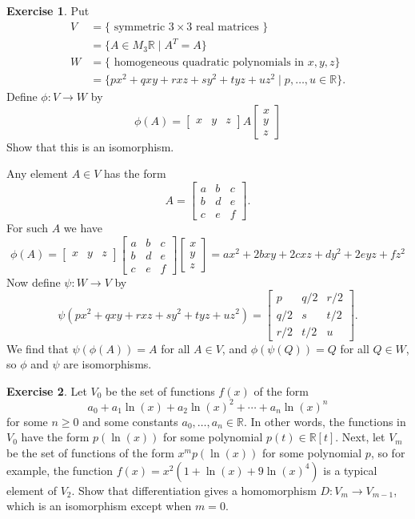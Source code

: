 \documentclass{amsart}
\newcommand{\R}         {{\mathbb{R}}}
\newcommand{\bpm}       {\left[\begin{matrix}}
\newcommand{\epm}       {\end{matrix}\right]}
\newcommand{\tm}        {\times}
\newcommand{\st}        {\;|\;}
\renewcommand{\:}{\colon}
\theoremstyle{definition}
\newtheorem{exercise}{Exercise}
\newenvironment{solution}{{\noindent \bf Solution:}}{}
\begin{document}
\begin{exercise}
 Put 
 \begin{align*}
  V &= \{\text{ symmetric $3\tm 3$ real matrices }\}  \\
    &= \{A\in M_3\R\st A^T=A\} \\
  W &= \{\text{ homogeneous quadratic polynomials in $x,y,z$}\} \\
    &= \{px^2+qxy+rxz+sy^2+tyz+uz^2\st p,\dotsc,u\in\R\}.
 \end{align*}
 Define $\phi\:V\to W$ by 
 \[ \phi(A) = \bpm x & y & z \epm A
              \bpm x \\ y \\ z \epm 
 \]
 Show that this is an isomorphism.
\end{exercise}
\begin{solution}
 Any element $A\in V$ has the form 
 \[ A = \bpm a & b & c \\ b & d & e \\ c & e & f \epm. \]
 For such $A$ we have 
 \[ \phi(A) = 
     \bpm x & y & z \epm 
     \bpm a & b & c \\ b & d & e \\ c & e & f \epm
     \bpm x \\ y \\ z \epm = 
     ax^2+2bxy+2cxz+dy^2+2eyz+fz^2    
 \]
 Now define $\psi\:W\to V$ by 
 \[ \psi(px^2+qxy+rxz+sy^2+tyz+uz^2) =
   \bpm p   & q/2 & r/2 \\
        q/2 & s   & t/2 \\
        r/2 & t/2 & u      \epm.
 \]
 We find that $\psi(\phi(A))=A$ for all $A\in V$, and
 $\phi(\psi(Q))=Q$ for all $Q\in W$, so $\phi$ and $\psi$ are 
 isomorphisms.
\end{solution}

\begin{exercise}
 Let $V_0$ be the set of functions $f(x)$ of the form
 \[ a_0 + a_1\ln(x) + a_2\ln(x)^2 + \dotsb + a_n\ln(x)^n \]
 for some $n\geq 0$ and some constants $a_0,\dotsc,a_n\in\R$.
 In other words, the functions in $V_0$ have the form $p(\ln(x))$ 
 for some polynomial $p(t)\in\R[t]$.  Next, let $V_m$ be the set 
 of functions of the form $x^mp(\ln(x))$ for some polynomial $p$,
 so for example, the function $f(x)=x^2(1+\ln(x)+9\ln(x)^4)$ is
 a typical element of $V_2$.  Show that differentiation gives a
 homomorphism $D\:V_m\to V_{m-1}$, which is an isomorphism except
 when $m=0$. 
\end{exercise}
\begin{solution}
 
\end{solution}
\end{document}
